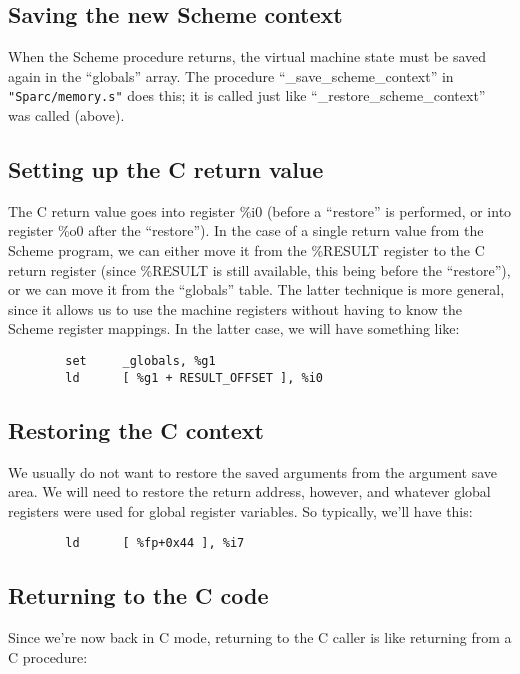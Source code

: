 \subsection{Saving the new Scheme context}

When the Scheme procedure returns, the virtual machine state must be
saved again in the ``globals'' array. The procedure
``\_save\_scheme\_context'' in \verb+"Sparc/memory.s"+ does this; it
is called just like ``\_restore\_scheme\_context'' was called (above).

\subsection{Setting up the C return value}

The C return value goes into register \%i0 (before a ``restore'' is
performed, or into register \%o0 after the ``restore''). In the case of a
single return value from the Scheme program, we can either move it
from the \%RESULT register to the C return register (since \%RESULT is
still available, this being before the ``restore''), or we can move it
from the ``globals'' table. The latter technique is more general, since
it allows us to use the machine registers without having to know the
Scheme register mappings. In the latter case, we will have something
like:

\begin{verbatim}
        set     _globals, %g1
        ld      [ %g1 + RESULT_OFFSET ], %i0
\end{verbatim}

\subsection{Restoring the C context}

We usually do not want to restore the saved arguments from the argument
save area. We will need to restore the return address, however, and whatever
global registers were used for global register variables. So typically,
we'll have this:

\begin{verbatim}
        ld      [ %fp+0x44 ], %i7
\end{verbatim}

\subsection{Returning to the C code}

Since we're now back in C mode, returning to the C caller is like returning
from a C procedure:

